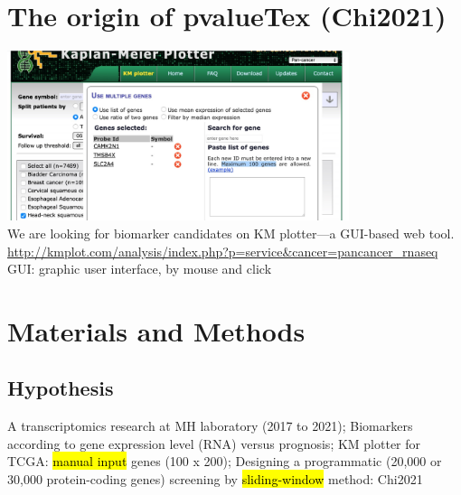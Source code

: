 \documentclass[
paper=landscape,
paper=160mm:90mm, %
fontsize=11pt, %
pagesize, %
parskip=half-, %
]{scrartcl} %
\theoremstyle{mythmstyle} %
\begin{document}
\clearpage
\section{The origin of pvalueTex (Chi2021)}

\includegraphics[width=10cm]{KM_plotter2021.jpg}\\
We are looking for biomarker candidates on KM plotter---a GUI-based web tool.\\
{\tiny \url{http://kmplot.com/analysis/index.php?p=service&cancer=pancancer_rnaseq}\\
GUI: graphic user interface, by mouse and click}

\clearpage
%
\section{Materials and Methods} %
\subsection{Hypothesis} 
\begin{outline}

\1 A transcriptomics research at MH laboratory (2017 to 2021);
\1 Biomarkers according to gene expression level (RNA) versus prognosis;
\1 KM plotter for TCGA: \hl{manual input} genes (100 x 200);
\1 Designing a programmatic (20,000 or 30,000 protein-coding genes) screening by \hl{sliding-window} method: Chi2021~\autocite{Chi2021}
\end{outline}

\thispagestyle{headings}
\end{document}
